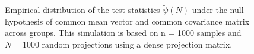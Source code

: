 \documentclass[alpha-refs]{wiley-article}
\theoremstyle{plain}%
\theoremstyle{definition}
\begin{document}
\begin{figure}[H]
  \centering
{}
\caption{Empirical distribution of the test statistics $\widetilde{\psi}(N)$ under the null hypothesis of common mean vector and common covariance matrix across groups. This simulation is based on n = 1000 samples and $N = 1000$ random projections using a dense projection matrix.}
  \label{fig:BFh0}
\end{figure}
  
\end{document}
